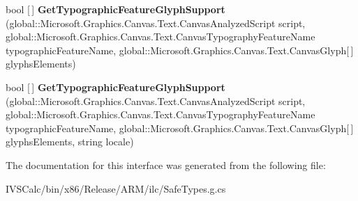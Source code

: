 \begin{DoxyCompactItemize}
\mbox{\label{interface_microsoft_1_1_graphics_1_1_canvas_1_1_text_1_1_i_canvas_font_face_a3ca04097c0081b708308456e13b4e899}} 
bool \mbox{[}$\,$\mbox{]} {\bfseries Get\+Typographic\+Feature\+Glyph\+Support} (global\+::\+Microsoft.\+Graphics.\+Canvas.\+Text.\+Canvas\+Analyzed\+Script script, global\+::\+Microsoft.\+Graphics.\+Canvas.\+Text.\+Canvas\+Typography\+Feature\+Name typographic\+Feature\+Name, global\+::\+Microsoft.\+Graphics.\+Canvas.\+Text.\+Canvas\+Glyph\mbox{[}$\,$\mbox{]} glyphs\+Elements)
\item 
\mbox{\label{interface_microsoft_1_1_graphics_1_1_canvas_1_1_text_1_1_i_canvas_font_face_a514a165ff64c3f1614b2f28786e28721}} 
bool \mbox{[}$\,$\mbox{]} {\bfseries Get\+Typographic\+Feature\+Glyph\+Support} (global\+::\+Microsoft.\+Graphics.\+Canvas.\+Text.\+Canvas\+Analyzed\+Script script, global\+::\+Microsoft.\+Graphics.\+Canvas.\+Text.\+Canvas\+Typography\+Feature\+Name typographic\+Feature\+Name, global\+::\+Microsoft.\+Graphics.\+Canvas.\+Text.\+Canvas\+Glyph\mbox{[}$\,$\mbox{]} glyphs\+Elements, string locale)
\end{DoxyCompactItemize}


The documentation for this interface was generated from the following file\+:\begin{DoxyCompactItemize}
\item 
I\+V\+S\+Calc/bin/x86/\+Release/\+A\+R\+M/ilc/Safe\+Types.\+g.\+cs\end{DoxyCompactItemize}

